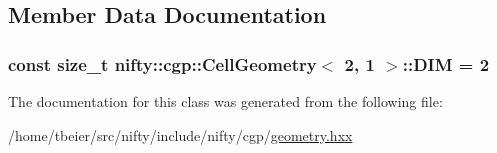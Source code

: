 \subsection{Member Data Documentation}
\hypertarget{classnifty_1_1cgp_1_1CellGeometry_3_012_00_011_01_4_a42d125e23384bc4a770893276750d9d1}{}
\subsubsection[{D\+I\+M}]{\setlength{\rightskip}{0pt plus 5cm}const size\+\_\+t {\bf nifty\+::cgp\+::\+Cell\+Geometry}$<$ 2, 1 $>$\+::D\+I\+M = 2\hspace{0.3cm}{\ttfamily [static]}}\label{classnifty_1_1cgp_1_1CellGeometry_3_012_00_011_01_4_a42d125e23384bc4a770893276750d9d1}


The documentation for this class was generated from the following file\+:\begin{DoxyCompactItemize}
\item 
/home/tbeier/src/nifty/include/nifty/cgp/\hyperlink{geometry_8hxx}{geometry.\+hxx}\end{DoxyCompactItemize}

